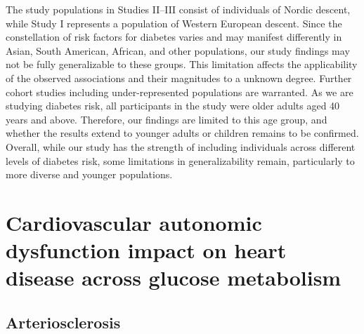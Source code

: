 \documentclass[
  a4paper,
  headsepline=true,
  open=any]{scrbook}
\begin{document}
The study populations in Studies II--III consist of individuals of
Nordic descent, while Study I represents a population of Western
European descent. Since the constellation of risk factors for diabetes
varies and may manifest differently in Asian, South American, African,
and other populations, our study findings may not be fully generalizable
to these groups. This limitation affects the applicability of the
observed associations and their magnitudes to a unknown degree. Further
cohort studies including under-represented populations are warranted. As
we are studying diabetes risk, all participants in the study were older
adults aged 40 years and above. Therefore, our findings are limited to
this age group, and whether the results extend to younger adults or
children remains to be confirmed. Overall, while our study has the
strength of including individuals across different levels of diabetes
risk, some limitations in generalizability remain, particularly to more
diverse and younger populations.


\hypertarget{cardiovascular-autonomic-dysfunction-impact-on-heart-disease-across-glucose-metabolism}{%
\chapter{Cardiovascular autonomic dysfunction impact on heart disease
across glucose
metabolism}\label{cardiovascular-autonomic-dysfunction-impact-on-heart-disease-across-glucose-metabolism}}

\hypertarget{arteriosclerosis-1}{%
\section{Arteriosclerosis}\label{arteriosclerosis-1}}
\end{document}
